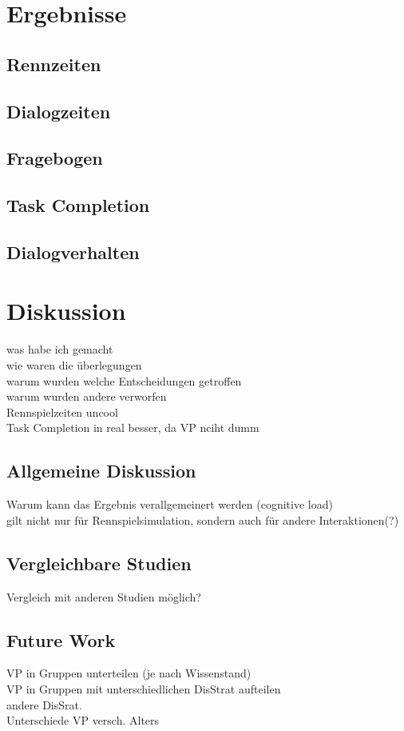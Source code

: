 \documentclass[12pt,a4paper]{scrartcl}
\begin{document}
\section{Ergebnisse}
\label{Ergebnisse}

\subsection{Rennzeiten}
\subsection{Dialogzeiten}
\subsection{Fragebogen}
\subsection{Task Completion}
\subsection{Dialogverhalten}

\section{Diskussion}
\label{discussion}
was habe ich gemacht\\
wie waren die überlegungen\\
warum wurden welche Entscheidungen getroffen\\
warum wurden andere verworfen\\
Rennspielzeiten uncool\\
Task Completion in real besser, da VP nciht dumm\\
\subsection{Allgemeine Diskussion}
Warum kann das Ergebnis verallgemeinert werden (cognitive load)\\
gilt nicht nur für Rennspielsimulation, sondern auch für andere Interaktionen(?)
\subsection{Vergleichbare Studien}
Vergleich mit anderen Studien möglich?\\
\subsection{Future Work}
VP in Gruppen unterteilen (je nach Wissenstand)\\
VP in Gruppen mit unterschiedlichen DisStrat aufteilen\\
andere DisSrat.\\
Unterschiede VP versch. Alters\\
\end{document}
